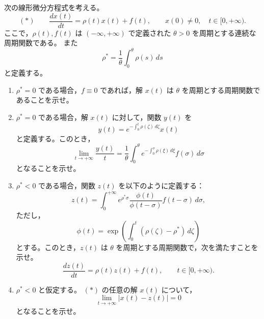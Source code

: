 \newcommand{\C}{\mathbb{C}}
\newcommand{\R}{\mathbb{R}}
\newcommand{\Z}{\mathbb{Z}}
\newcommand{\Tr}{\operatorname{Tr}}
\newcommand{\Impart}{\operatorname{Im}}
\newcommand{\AF}{\operatorname{AF}}
\newcommand{\AX}{\operatorname{AX}}
\newcommand{\GL}{\operatorname{GL}}


次の線形微分方程式を考える。
\[
  (*)\qquad
  \frac{dx(t)}{dt}=\rho(t)x(t)+f(t),\qquad
  x(0)\ne0,\quad t\in[0,+\infty).
\]
ここで，\(\rho(t),f(t)\) は \((-\infty,+\infty)\) で定義された \(\theta>0\) を周期とする連続な周期関数である。
また
\[
  \rho^*=\frac1\theta\int_0^\theta \rho(s)\,ds
\]
と定義する。

\begin{enumerate}
  \item \(\rho^*=0\) である場合，\(f\equiv0\) であれば，解 \(x(t)\) は \(\theta\) を周期とする周期関数であることを示せ。
  \item \(\rho^*=0\) である場合，解 \(x(t)\) に対して，関数 \(y(t)\) を
  \[
    y(t)=e^{-\int_0^t\rho(\zeta)\,d\zeta}x(t)
  \]
  と定義する。このとき，
  \[
    \lim_{t\to+\infty}\frac{y(t)}{t}
      =\frac1\theta\int_0^\theta
      e^{-\int_0^\sigma \rho(\xi)\,d\xi}f(\sigma)\,d\sigma
  \]
  となることを示せ。
  \item \(\rho^*<0\) である場合，関数 \(z(t)\) を以下のように定義する：
  \[
    z(t)=\int_0^{+\infty}
      e^{\rho^*\sigma}\frac{\phi(t)}{\phi(t-\sigma)}f(t-\sigma)\,d\sigma,
  \]
  ただし，
  \[
    \phi(t)=\exp\left(\int_0^t(\rho(\zeta)-\rho^*)\,d\zeta\right)
  \]
  とする。このとき，\(z(t)\) は \(\theta\) を周期とする周期関数で，次を満たすことを示せ。
  \[
    \frac{dz(t)}{dt}=\rho(t)z(t)+f(t),\qquad t\in[0,+\infty).
  \]
  \item \(\rho^*<0\) と仮定する。 \((*)\) の任意の解 \(x(t)\) について，
  \[
    \lim_{t\to+\infty}|x(t)-z(t)|=0
  \]
  となることを示せ。
\end{enumerate}

%